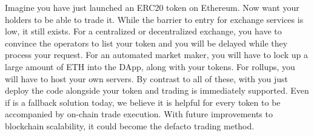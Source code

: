 Imagine you have just launched an ERC20 token on Ethereum. Now want your holders to be able to trade it. While the barrier to entry for exchange services is low, it still exists. For a centralized or decentralized exchange, you have to convince the operators to list your token and you will be delayed while they process your request. For an automated market maker, you will have to lock up a large amount of ETH into the DApp, along with your tokens. For rollups, you will have to host your own servers. By contrast to all of these, with \cm you just deploy the code alongside your token and trading is immediately supported. Even if \cm is a fallback solution today, we believe it is helpful for every token to be accompanied by on-chain trade execution. With future improvements to blockchain scalability, it could become the defacto trading method.
 
































